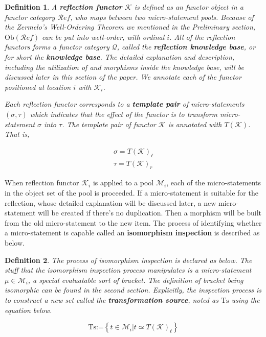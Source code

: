\documentclass{aims}
\newtheorem{definition}{Definition}	%
\numberwithin{theorem}{section}	%
\numberwithin{axiom}{section}	%
\numberwithin{definition}{section}	%
\begin{document}
\begin{definition}
	A \textbf{ reflection functor} \(\mathcal{K}\) is defined as an functor object in a functor category \(\mathcal{R}\mathit{e}\mathit{f}\), who maps between two micro-statement pools. Because of the Zermelo{'}s Well-Ordering Theorem we mentioned in the Preliminary section, \(\text{Ob}(\mathcal{R}\mathit{e}\mathit{f})\) can be put into well-order, with ordinal \(i\). All of the reflection functors forms a functor category \(\mathcal{Q}\), called the \textbf{ reflection knowledge base}, or for short the \textbf{ knowledge base}. The detailed explanation and description, including the utilization of and morphisms inside the knowledge base, will be discussed later in this section of the paper. We annotate each of the functor positioned at location \(i\) with \(\mathcal{K}_i\).
	
	Each reflection functor corresponds to a \textbf{ template pair} of micro-statements \((\sigma ,\tau )\) which indicates that the effect of the functor is to transform micro-statement \(\sigma\) into $\tau $. The template pair of functor \(\mathcal{K}\) is annotated with \(T(\mathcal{K})\). That
	is,
	
	\begin{equation}
		\begin{gathered}
			\sigma =T(\mathcal{K})_{\ell }\\
			\tau =T(\mathcal{K})_{\mathit{r}}
		\end{gathered}
	\end{equation}
\end{definition}

When reflection functor \(\mathcal{K}_i\) is applied to a pool \(\mathcal{M}_i\), each of the micro-statements in the object set of the pool is proceeded. If a micro-statement is suitable for the reflection, whose detailed explanation will be discussed later, a new micro-statement will be created if there{'}s no duplication. Then a morphism will be built from the old micro-statement to the new item. The process of identifying whether a micro-statement is capable called an \textbf{ isomorphism inspection} is described as below.

\begin{definition}
	The process of isomorphism inspection is declared as below. The stuff that the isomorphism inspection process manipulates is a micro-statement \(\mu \in \mathcal{M}_i\), a special evaluatable sort of bracket. The definition of bracket being isomorphic can be found in the second section. Explicitly, the inspection process is to construct a new set called the \textbf{ transformation source}, noted as \(\text{Ts}\) using the equation below.
	
	\begin{equation}
		\text{Ts}\text{:=}\left\{t\in \mathcal{M}_i|t\simeq T(\mathcal{K})_{\ell }\right\}
	\end{equation}
\end{definition}
\end{document}
